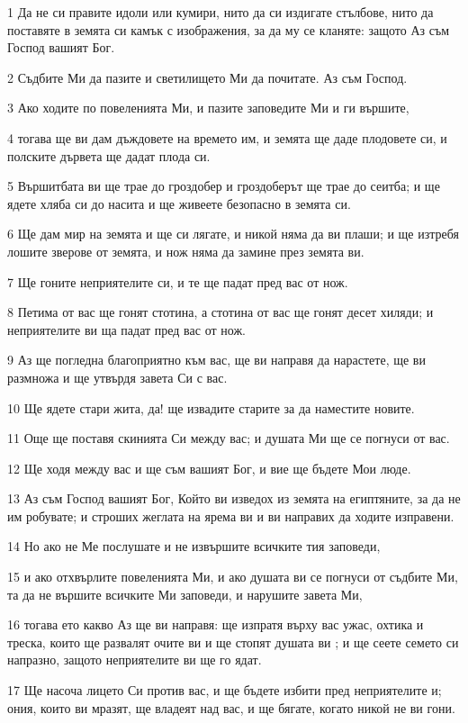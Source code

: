 \par 1 Да не си правите идоли или кумири, нито да си издигате стълбове, нито да поставяте в земята си камък с изображения, за да му се кланяте: защото Аз съм Господ вашият Бог.
\par 2 Съдбите Ми да пазите и светилището Ми да почитате. Аз съм Господ.
\par 3 Ако ходите по повеленията Ми, и пазите заповедите Ми и ги вършите,
\par 4 тогава ще ви дам дъждовете на времето им, и земята ще даде плодовете си, и полските дървета ще дадат плода си.
\par 5 Вършитбата ви ще трае до гроздобер и гроздоберът ще трае до сеитба; и ще ядете хляба си до насита и ще живеете безопасно в земята си.
\par 6 Ще дам мир на земята и ще си лягате, и никой няма да ви плаши; и ще изтребя лошите зверове от земята, и нож няма да замине през земята ви.
\par 7 Ще гоните неприятелите си, и те ще падат пред вас от нож.
\par 8 Петима от вас ще гонят стотина, а стотина от вас ще гонят десет хиляди; и неприятелите ви ща падат пред вас от нож.
\par 9 Аз ще погледна благоприятно към вас, ще ви направя да нарастете, ще ви размножа и ще утвърдя завета Си с вас.
\par 10 Ще ядете стари жита, да! ще извадите старите за да наместите новите.
\par 11 Още ще поставя скинията Си между вас; и душата Ми ще се погнуси от вас.
\par 12 Ще ходя между вас и ще съм вашият Бог, и вие ще бъдете Мои люде.
\par 13 Аз съм Господ вашият Бог, Който ви изведох из земята на египтяните, за да не им робувате; и строших жеглата на ярема ви и ви направих да ходите изправени.
\par 14 Но ако не Ме послушате и не извършите всичките тия заповеди,
\par 15 и ако отхвърлите повеленията Ми, и ако душата ви се погнуси от съдбите Ми, та да не вършите всичките Ми заповеди, и нарушите завета Ми,
\par 16 тогава ето какво Аз ще ви направя: ще изпратя върху вас ужас, охтика и треска, които ще развалят очите ви и ще стопят душата ви ; и ще сеете семето си напразно, защото неприятелите ви ще го ядат.
\par 17 Ще насоча лицето Си против вас, и ще бъдете избити пред неприятелите и; ония, които ви мразят, ще владеят над вас, и ще бягате, когато никой не ви гони.

